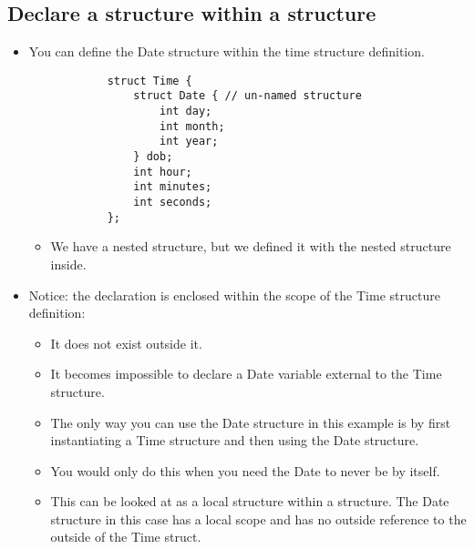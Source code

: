 \subsection{Declare a structure within a structure}
\begin{itemize}
    \item You can define the Date structure within the time structure definition.
        \begin{verbatim}
            struct Time {
                struct Date { // un-named structure
                    int day; 
                    int month; 
                    int year;
                } dob;
                int hour;
                int minutes;
                int seconds;
            };
        \end{verbatim}
        \begin{itemize}
            \item We have a nested structure, but we defined it with the nested structure inside.
        \end{itemize}
    
    \item Notice: the declaration is enclosed within the scope of the Time structure definition:
        \begin{itemize}
            \item It does not exist outside it. 
            \item It becomes impossible to declare a Date variable external to the Time structure. 
            \item The only way you can use the Date structure in this example is by first instantiating a Time structure and then using the Date structure. 
            \item You would only do this when you need the Date to never be by itself. 
            \item This can be looked at as a local structure within a structure. The Date structure in this case has a local scope and has no outside reference to the outside of the Time struct. 
        \end{itemize}
\end{itemize}


